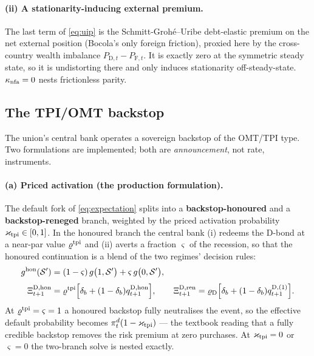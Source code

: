 \documentclass[11pt]{article}
\numberwithin{equation}{section}
\newcommand{\D}{\mathrm{D}}
\newcommand{\F}{\mathrm{F}}
\theoremstyle{definition}
\theoremstyle{plain}
\theoremstyle{remark}
\begin{document}
\paragraph{(ii) A stationarity-inducing external premium.} The last term of
\eqref{eq:uip} is the Schmitt-Grohé--Uribe debt-elastic premium on the net external
position (Bocola's only foreign friction), proxied here by the cross-country wealth
imbalance $P_{\D,t}-P_{\F,t}$. It is exactly zero at the symmetric steady state, so
it is undistorting there and only induces stationarity off-steady-state.
$\kappa_{\rm nfa}=0$ nests frictionless parity.

\subsection{The TPI/OMT backstop}
\label{sec:tpi}



The union's central bank operates a sovereign backstop of the OMT/TPI type. Two
formulations are implemented; both are \emph{announcement}, not rate, instruments.

\paragraph{(a) Priced activation (the production formulation).} The default fork of
\eqref{eq:expectation} splits into a \textbf{backstop-honoured} and a
\textbf{backstop-reneged} branch, weighted by the priced activation probability
$\varkappa_{\rm tpi}\in[0,1]$. In the honoured branch the central bank (i) redeems
the $\D$-bond at a near-par value $\varrho^{\rm tpi}$ and (ii) averts a fraction
$\varsigma$ of the recession, so that the honoured continuation is a blend of the two
regimes' decision rules:
\begin{align}
g^{\rm hon}(\mathcal{S}')&=(1-\varsigma)\,g\bigl(1,\mathcal{S}'\bigr)
                          +\varsigma\,g\bigl(0,\mathcal{S}'\bigr),
\label{eq:tpi-blend}\\[3pt]
\Xi^{\D,\rm hon}_{t+1}&=\varrho^{\rm tpi}\Bigl[\delta_b+(1-\delta_b)q^{\D,\rm hon}_{t+1}\Bigr],
\qquad
\Xi^{\D,\rm ren}_{t+1}=\varrho_\D\Bigl[\delta_b+(1-\delta_b)q^{\D,(1)}_{t+1}\Bigr].
\label{eq:tpi-payoffs}
\end{align}
At $\varrho^{\rm tpi}=\varsigma=1$ a honoured backstop fully neutralises the event,
so the effective default probability becomes $\pi^{d}_t(1-\varkappa_{\rm tpi})$ ---
the textbook reading that a fully credible backstop removes the risk premium at zero
purchases. At $\varkappa_{\rm tpi}=0$ or $\varsigma=0$ the two-branch solve is nested
exactly.
\end{document}
